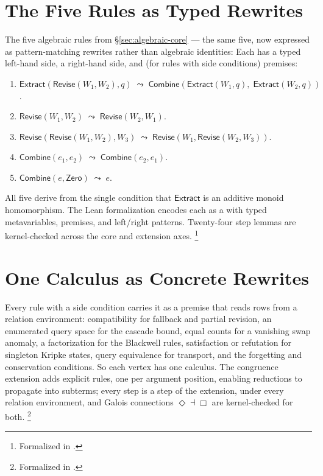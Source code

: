 \documentclass[11pt,openany]{report}
\begin{document}
\section{The Five Rules as Typed Rewrites}
\label{sec:five-as-rewrites}

The five algebraic rules from \S\ref{sec:algebraic-core} --- the
same five, now expressed as pattern-matching rewrites rather than
algebraic identities:  Each has a typed left-hand
side, a right-hand side, and (for rules with side conditions) premises:

\begin{enumerate}
\item $\mathsf{Extract}(\mathsf{Revise}(W_1, W_2), q) \;\leadsto\;
  \mathsf{Combine}(\mathsf{Extract}(W_1, q),\;
  \mathsf{Extract}(W_2, q))$.

\item $\mathsf{Revise}(W_1, W_2) \;\leadsto\;
  \mathsf{Revise}(W_2, W_1)$.

\item $\mathsf{Revise}(\mathsf{Revise}(W_1, W_2), W_3)
  \;\leadsto\; \mathsf{Revise}(W_1, \mathsf{Revise}(W_2, W_3))$.

\item $\mathsf{Combine}(e_1, e_2) \;\leadsto\;
  \mathsf{Combine}(e_2, e_1)$.

\item $\mathsf{Combine}(e, \mathsf{Zero}) \;\leadsto\; e$.
\end{enumerate}

\noindent
All five derive from the single condition that $\mathsf{Extract}$ is
an additive monoid homomorphism.  The Lean formalization encodes each
as a  with typed metavariables, premises, and
left/right patterns.  Twenty-four step lemmas are kernel-checked across
the core and extension axes.%
\footnote{Formalized in
.}


\section{One Calculus as Concrete Rewrites}

Every rule with a side condition carries it as a premise that reads rows from
a relation environment: compatibility for fallback and partial revision, an
enumerated query space for the cascade bound, equal counts for a vanishing
swap anomaly, a factorization for the Blackwell rules, satisfaction or
refutation for singleton Kripke states, query equivalence for transport, and
the forgetting and conservation conditions.  So each vertex has one calculus.
The congruence extension adds explicit rules, one per argument position,
enabling reductions to propagate into subterms; every step is a step of the
extension, under every relation environment, and Galois connections
$\Diamond \dashv \Box$ are kernel-checked for both.%
\footnote{Formalized in
.}
\end{document}
